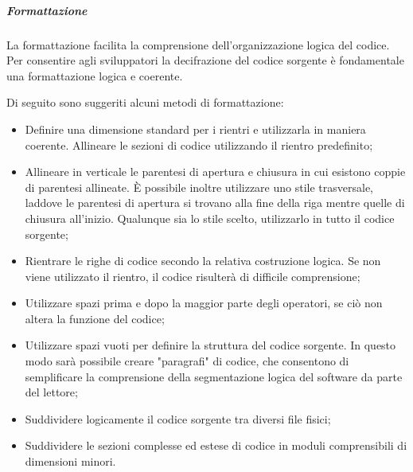 \subparagraph{Formattazione}
La formattazione facilita la comprensione dell'organizzazione logica del codice. Per consentire agli sviluppatori la decifrazione del codice sorgente è fondamentale una formattazione logica e coerente.

Di seguito sono suggeriti alcuni metodi di formattazione:
\begin{itemize}
\item
Definire una dimensione standard per i rientri e utilizzarla in maniera coerente. Allineare le sezioni di codice utilizzando il rientro predefinito;
\item
Allineare in verticale le parentesi di apertura e chiusura in cui esistono coppie di parentesi allineate. È possibile inoltre utilizzare uno stile trasversale, laddove le parentesi di apertura si trovano alla fine della riga mentre quelle di chiusura all'inizio. Qualunque sia lo stile scelto, utilizzarlo in tutto il codice sorgente;
\item
Rientrare le righe di codice secondo la relativa costruzione logica. Se non viene utilizzato il rientro, il codice risulterà di difficile comprensione;
\item
Utilizzare spazi prima e dopo la maggior parte degli operatori, se ciò non altera la funzione del codice;
\item
Utilizzare spazi vuoti per definire la struttura del codice sorgente. In questo modo sarà possibile creare "paragrafi" di codice, che consentono di semplificare la comprensione della segmentazione logica del software da parte del lettore;
\item
Suddividere logicamente il codice sorgente tra diversi file fisici;
\item
Suddividere le sezioni complesse ed estese di codice in moduli comprensibili di dimensioni minori.
\end{itemize}

